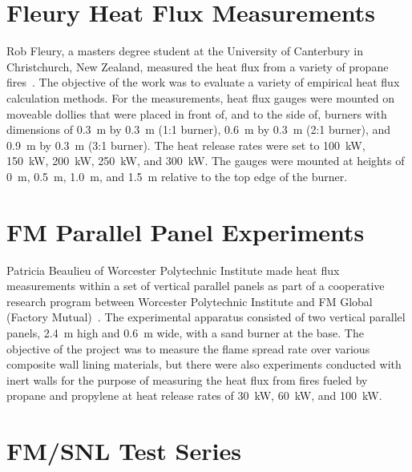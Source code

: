 \section{Fleury Heat Flux Measurements}

Rob Fleury, a masters degree student at the University of Canterbury in Christchurch, New Zealand, measured the heat flux from a variety of propane fires~\cite{Fleury:Masters}.
The objective of the work was to evaluate a variety of empirical heat flux calculation methods. For the measurements, heat flux gauges were mounted on moveable dollies that
were placed in front of, and to the side of, burners with dimensions of 0.3~m by 0.3~m (1:1 burner), 0.6~m by 0.3~m (2:1 burner), and 0.9~m by 0.3~m (3:1 burner). The heat release
rates were set to 100~kW, 150~kW, 200~kW, 250~kW, and 300~kW. The gauges were mounted at heights of 0~m, 0.5~m, 1.0~m, and 1.5~m relative to the top edge of the burner.

\section{FM Parallel Panel Experiments}

Patricia Beaulieu of Worcester Polytechnic Institute made heat flux measurements within a set of vertical parallel panels as part of a cooperative research program between Worcester Polytechnic Institute and FM Global (Factory Mutual)~\cite{Beaulieu:FM}. The experimental apparatus consisted of two vertical parallel panels, 2.4~m high and 0.6~m wide, with a sand burner at the base. The objective of the project was to measure the flame spread rate over various composite wall lining materials, but there were also experiments conducted with inert walls for the purpose of measuring the heat flux from fires fueled by propane and propylene at heat release rates of 30~kW, 60~kW, and 100~kW.



\section{FM/SNL Test Series}


